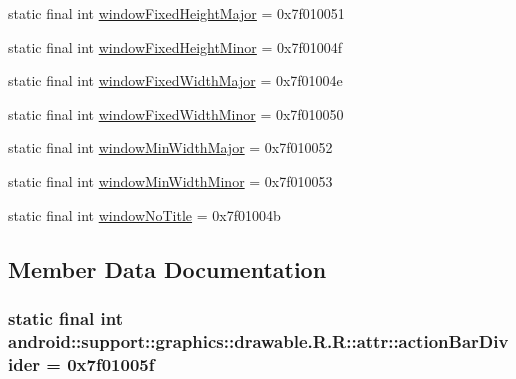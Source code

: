 \begin{CompactItemize}
static final int \hyperlink{classandroid_1_1support_1_1graphics_1_1drawable_1_1_r_1_1attr_4fa1e3901c4b2a78582aee6722780f44}{windowFixedHeightMajor} = 0x7f010051
\item 
static final int \hyperlink{classandroid_1_1support_1_1graphics_1_1drawable_1_1_r_1_1attr_42882eb170f071a9440984c7e98a127d}{windowFixedHeightMinor} = 0x7f01004f
\item 
static final int \hyperlink{classandroid_1_1support_1_1graphics_1_1drawable_1_1_r_1_1attr_ed96fac4ecab18a01738ef7fcc33573c}{windowFixedWidthMajor} = 0x7f01004e
\item 
static final int \hyperlink{classandroid_1_1support_1_1graphics_1_1drawable_1_1_r_1_1attr_7382f22cefa347208406622d5de4a904}{windowFixedWidthMinor} = 0x7f010050
\item 
static final int \hyperlink{classandroid_1_1support_1_1graphics_1_1drawable_1_1_r_1_1attr_d34b72698a8b9265c826ffb788ad2bc8}{windowMinWidthMajor} = 0x7f010052
\item 
static final int \hyperlink{classandroid_1_1support_1_1graphics_1_1drawable_1_1_r_1_1attr_4dc1f9434a2d289cde4bdcdf17f535ac}{windowMinWidthMinor} = 0x7f010053
\item 
static final int \hyperlink{classandroid_1_1support_1_1graphics_1_1drawable_1_1_r_1_1attr_f3e6e8581d4810235eb570d06f22c239}{windowNoTitle} = 0x7f01004b
\end{CompactItemize}


\subsection{Member Data Documentation}
\hypertarget{classandroid_1_1support_1_1graphics_1_1drawable_1_1_r_1_1attr_d4af8316e59298bb51889c07698401bf}{
\subsubsection[{actionBarDivider}]{\setlength{\rightskip}{0pt plus 5cm}static final int android::support::graphics::drawable.R.R::attr::actionBarDivider = 0x7f01005f}}
\label{classandroid_1_1support_1_1graphics_1_1drawable_1_1_r_1_1attr_d4af8316e59298bb51889c07698401bf}


